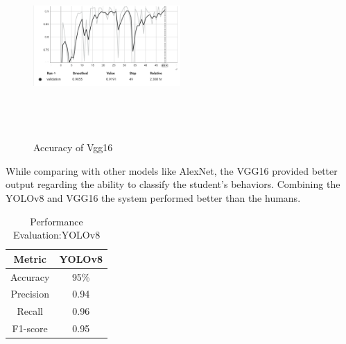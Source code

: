 \documentclass[conference]{IEEEtran}
\begin{document}
\begin{figure}[htbp]
\centering
\includegraphics[width=0.5\textwidth, height=7cm]{images/Vgg16acc.png}  
\caption{Accuracy of Vgg16}
\label{fig}
\end{figure}

While comparing with other models like AlexNet, the VGG16 provided better output regarding the ability to classify the student's behaviors. Combining the YOLOv8 and VGG16 the system performed better than the humans. 




\begin{table}[htbp]
\caption{Performance Evaluation:YOLOv8}
\label{tab2} %
\begin{center}
\begin{tabular}{|c|c|}
\hline
\textbf{Metric} & \textbf{YOLOv8} \\ %
\hline
Accuracy & 95\% \\ %

\hline
Precision&0.94\\
\hline
Recall&0.96\\
\hline
 F1-score&0.95 \\

\hline
\end{tabular}
\end{center}
\end{table}
\end{document}
